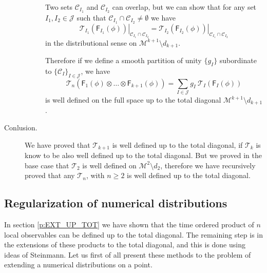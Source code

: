 \documentclass[11pt]{book}
\newcommand{\Ccal}{\mathcal{C}}
\newcommand{\Jcal}{\mathcal{J}}
\newcommand{\Mcal}{\mathcal{M}}
\newcommand{\Tcal}{\mathcal{T}}
\newcommand{\Fsf}{\mathsf{F}}
\theoremstyle{break}
\begin{document}
\begin{description}
\begin{description}
Two sets $\Ccal_{I_1}$ and $\Ccal_{I_2}$ can overlap, but we can show \cite[Poposition 4.2]{brunetti_microlocal_2000} that for any set $I_1 , I_2 \in \Jcal$ such that $\Ccal_{I_1} \cap \Ccal_{I_2} \neq \emptyset$ we have 
%
\begin{equation*}
\left. \Tcal_{I_1}\left(\Fsf_{I_1}(\phi)\right) \right|_{\Ccal_{I_1} \cap \Ccal_{I_2}} = \left. \Tcal_{I_2}\left(\Fsf_{I_2}(\phi)\right) \right|_{\Ccal_{I_1} \cap \Ccal_{I_2}}
\end{equation*}
%
in the distributional sense on $\Mcal^{k+1}\setminus d_{k+1}$.


Therefore if we define a smooth partition of unity $\{ g_I\}$  subordinate to $\{\Ccal_I\}_{I\in\Jcal}$, we have
%
\begin{equation*}
\Tcal_n\left(\Fsf_1(\phi) \otimes \dots \otimes \Fsf_{k+1}(\phi) \right) = \sum_{I\in\Jcal} g_I \  \Tcal_{I}\left(\Fsf_I(\phi)\right)  
\end{equation*}
%
is well defined on the full space up to the total diagonal $\Mcal^{k+1} \setminus d_{k+1}$. 


\end{description}


\item[Conlusion.] We have proved that $\Tcal_{k+1}$ is well defined up to the total diagonal, if $\Tcal_k$ is know to be also well defined up to the total diagonal. But we proved in the base case that $\Tcal_2$ is well defined on $\Mcal^2\setminus d_2$, therefore we have recursively proved that any $\Tcal_n$, with $n\geq2$ is well defined up to the total diagonal.


\end{description}


\subsection{Regularization of numerical distributions}
\label{p:REG_NUMERRIC}


In section \ref{p:EXT_UP_TOT} we have shown that the time ordered product of $n$ local observables can be defined up to the total diagonal. The remaining step is in the extensions of these products to the total diagonal, and this is done using ideas of Steinmann. Let us first of all present these methods to the problem of extending a numerical distributions on a point. 
\end{document}
